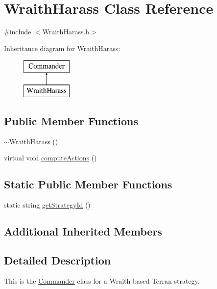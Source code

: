 \hypertarget{class_wraith_harass}{\section{Wraith\-Harass Class Reference}
\label{class_wraith_harass}
}


{\ttfamily \#include $<$Wraith\-Harass.\-h$>$}

Inheritance diagram for Wraith\-Harass\-:\begin{figure}[H]
\begin{center}
\leavevmode
\includegraphics[height=2.000000cm]{class_wraith_harass}
\end{center}
\end{figure}
\subsection*{Public Member Functions}
\begin{DoxyCompactItemize}
\item 
\hyperlink{class_wraith_harass_af571315fad954442e38f7d0f4d246dfa}{$\sim$\-Wraith\-Harass} ()
\item 
virtual void \hyperlink{class_wraith_harass_aebbba0317db7269fdde750216e2077c4}{compute\-Actions} ()
\end{DoxyCompactItemize}
\subsection*{Static Public Member Functions}
\begin{DoxyCompactItemize}
\item 
static string \hyperlink{class_wraith_harass_a8ad8a3c0572d40261f2c8edba372d645}{get\-Strategy\-Id} ()
\end{DoxyCompactItemize}
\subsection*{Additional Inherited Members}


\subsection{Detailed Description}
This is the \hyperlink{class_commander}{Commander} class for a Wraith based Terran strategy.

